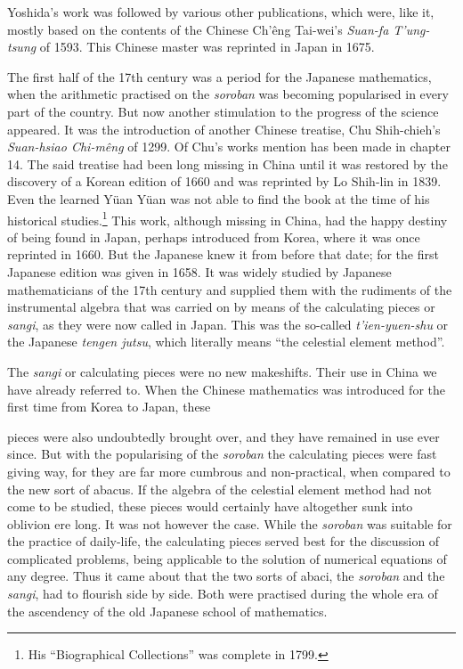 \documentclass[11pt]{article}
\newcommand{\scanpage}[2]{\clearpage\setcounter{footnote}{0}\noindent{\footnotesize\color{gray}PDF page #1 · #2}\par\medskip}
\newcommand{\scanfooter}{}
\begin{document}
Yoshida's work was followed by various other publications, which were, like it, mostly based on the contents of the Chinese Ch'êng Tai-wei's \emph{Suan-fa T'ung-tsung} of 1593. This Chinese master was reprinted in Japan in 1675.

The first half of the 17th century was a period for the Japanese mathematics, when the arithmetic practised on the \emph{soroban} was becoming popularised in every part of the country. But now another stimulation to the progress of the science appeared. It was the introduction of another Chinese treatise, Chu Shih-chieh's \emph{Suan-hsiao Chi-mêng} of 1299. Of Chu's works mention has been made in chapter 14. The said treatise had been long missing in China until it was restored by the discovery of a Korean edition of 1660 and was reprinted by Lo Shih-lin in 1839. Even the learned Yüan Yüan was not able to find the book at the time of his historical studies.\footnote{His ``Biographical Collections'' was complete in 1799.} This work, although missing in China, had the happy destiny of being found in Japan, perhaps introduced from Korea, where it was once reprinted in 1660. But the Japanese knew it from before that date; for the first Japanese edition was given in 1658. It was widely studied by Japanese mathematicians of the 17th century and supplied them with the rudiments of the instrumental algebra that was carried on by means of the calculating pieces or \emph{sangi}, as they were now called in Japan. This was the so-called \emph{t'ien-yuen-shu} or the Japanese \emph{tengen jutsu}, which literally means ``the celestial element method''.

The \emph{sangi} or calculating pieces were no new makeshifts. Their use in China we have already referred to. When the Chinese mathematics was introduced for the first time from Korea to Japan, these
\scanfooter

\scanpage{0172}{Chapter 22, printed page 158}
pieces were also undoubtedly brought over, and they have remained in use ever since. But with the popularising of the \emph{soroban} the calculating pieces were fast giving way, for they are far more cumbrous and non-practical, when compared to the new sort of abacus. If the algebra of the celestial element method had not come to be studied, these pieces would certainly have altogether sunk into oblivion ere long. It was not however the case. While the \emph{soroban} was suitable for the practice of daily-life, the calculating pieces served best for the discussion of complicated problems, being applicable to the solution of numerical equations of any degree. Thus it came about that the two sorts of abaci, the \emph{soroban} and the \emph{sangi}, had to flourish side by side. Both were practised during the whole era of the ascendency of the old Japanese school of mathematics.
\end{document}
